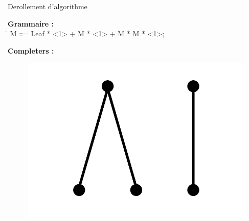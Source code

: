 \documentclass{beamer}
\begin{document}
\begin{frame}{Derollement d'algorithme}
\begin{tabbing}
\textbf{Grammaire :} \\
\hspace{0.5cm} \= \kill
\hspace{0.5cm} 
\> M ::= Leaf * <1> + M * <1> + M * M * <1>; \\
\end{tabbing}
\textbf{Completers :} \\
\begin{figure}[h]
\centering
\includegraphics[scale=0.2]{const.png}
\end{figure}
\end{frame}
\end{document}
